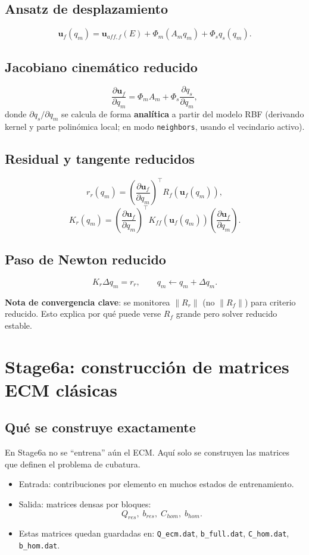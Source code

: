 \documentclass[11pt,a4paper]{article}
\begin{document}
\subsection{Ansatz de desplazamiento}
\[
\mathbf{u}_f(q_m)=\mathbf{u}_{aff,f}(E)+\Phi_m(A_m q_m)+\Phi_s q_s(q_m).
\]

\subsection{Jacobiano cinemático reducido}
\[
\frac{\partial \mathbf{u}_f}{\partial q_m}
=
\Phi_m A_m
+
\Phi_s\frac{\partial q_s}{\partial q_m},
\]
donde $\partial q_s/\partial q_m$ se calcula de forma \textbf{analítica} a partir del modelo RBF
(derivando kernel y parte polinómica local; en modo \texttt{neighbors}, usando el vecindario activo).

\subsection{Residual y tangente reducidos}
\[
r_r(q_m)=
\left(\frac{\partial \mathbf{u}_f}{\partial q_m}\right)^\top
R_f(\mathbf{u}_f(q_m)),
\]
\[
K_r(q_m)=
\left(\frac{\partial \mathbf{u}_f}{\partial q_m}\right)^\top
K_{ff}(\mathbf{u}_f(q_m))
\left(\frac{\partial \mathbf{u}_f}{\partial q_m}\right).
\]

\subsection{Paso de Newton reducido}
\[
K_r \Delta q_m = r_r,
\qquad
q_m \leftarrow q_m + \Delta q_m.
\]

\textbf{Nota de convergencia clave}: se monitorea $\|R_r\|$ (no $\|R_f\|$) para criterio reducido.
Esto explica por qué puede verse $R_f$ grande pero solver reducido estable.

\section{Stage6a: construcción de matrices ECM clásicas}
\subsection{Qué se construye exactamente}
En Stage6a no se ``entrena'' aún el ECM. Aquí solo se construyen las matrices
que definen el problema de cubatura.

\begin{itemize}[leftmargin=1.5em]
\item Entrada: contribuciones por elemento en muchos estados de entrenamiento.
\item Salida: matrices densas por bloques:
  \[
  Q_{res},\; b_{res},\; C_{hom},\; b_{hom}.
  \]
\item Estas matrices quedan guardadas en:
\texttt{Q\_ecm.dat}, \texttt{b\_full.dat}, \texttt{C\_hom.dat}, \texttt{b\_hom.dat}.
\end{itemize}
\end{document}
